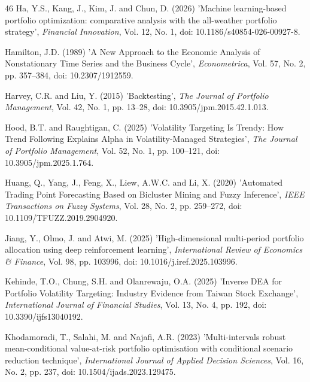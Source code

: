 \documentclass{singlecol-new}
\theoremstyle{TH}{
\newtheorem{lemma}{Lemma}
\newtheorem{theorem}[lemma]{Theorem}
\newtheorem{corrolary}[lemma]{Corrolary}
\newtheorem{conjecture}[lemma]{Conjecture}
\newtheorem{proposition}[lemma]{Proposition}
\newtheorem{claim}[lemma]{Claim}
\newtheorem{stheorem}[lemma]{Wrong Theorem}
\newtheorem{algorithm}{Algorithm}
}
\theoremstyle{THrm}{
\newtheorem{definition}{Definition}[section]
\newtheorem{question}{Question}[section]
\newtheorem{remark}{Remark}
\newtheorem{scheme}{Scheme}
}
\theoremstyle{THhit}{
\newtheorem{case}{Case}[section]
}
\begin{document}
\begin{thebibliography}{46}
Ha, Y.S., Kang, J., Kim, J. and Chun, D. (2026) 'Machine learning-based portfolio optimization: comparative analysis with the all-weather portfolio strategy', {\it Financial Innovation}, Vol. 12, No. 1, doi: 10.1186/s40854-026-00927-8.

Hamilton, J.D. (1989) 'A New Approach to the Economic Analysis of Nonstationary Time Series and the Business Cycle', {\it Econometrica}, Vol. 57, No. 2, pp. 357--384, doi: 10.2307/1912559.

Harvey, C.R. and Liu, Y. (2015) 'Backtesting', {\it The Journal of Portfolio Management}, Vol. 42, No. 1, pp. 13--28, doi: 10.3905/jpm.2015.42.1.013.

Hood, B.T. and Raughtigan, C. (2025) 'Volatility Targeting Is Trendy: How Trend Following Explains Alpha in Volatility-Managed Strategies', {\it The Journal of Portfolio Management}, Vol. 52, No. 1, pp. 100--121, doi: 10.3905/jpm.2025.1.764.

Huang, Q., Yang, J., Feng, X., Liew, A.W.C. and Li, X. (2020) 'Automated Trading Point Forecasting Based on Bicluster Mining and Fuzzy Inference', {\it IEEE Transactions on Fuzzy Systems}, Vol. 28, No. 2, pp. 259--272, doi: 10.1109/TFUZZ.2019.2904920.

Jiang, Y., Olmo, J. and Atwi, M. (2025) 'High-dimensional multi-period portfolio allocation using deep reinforcement learning', {\it International Review of Economics \& Finance}, Vol. 98, pp. 103996, doi: 10.1016/j.iref.2025.103996.

Kehinde, T.O., Chung, S.H. and Olanrewaju, O.A. (2025) 'Inverse DEA for Portfolio Volatility Targeting: Industry Evidence from Taiwan Stock Exchange', {\it International Journal of Financial Studies}, Vol. 13, No. 4, pp. 192, doi: 10.3390/ijfs13040192.

Khodamoradi, T., Salahi, M. and Najafi, A.R. (2023) 'Multi-intervals robust mean-conditional value-at-risk portfolio optimisation with conditional scenario reduction technique', {\it International Journal of Applied Decision Sciences}, Vol. 16, No. 2, pp. 237, doi: 10.1504/ijads.2023.129475.


\end{thebibliography}
\end{document}

